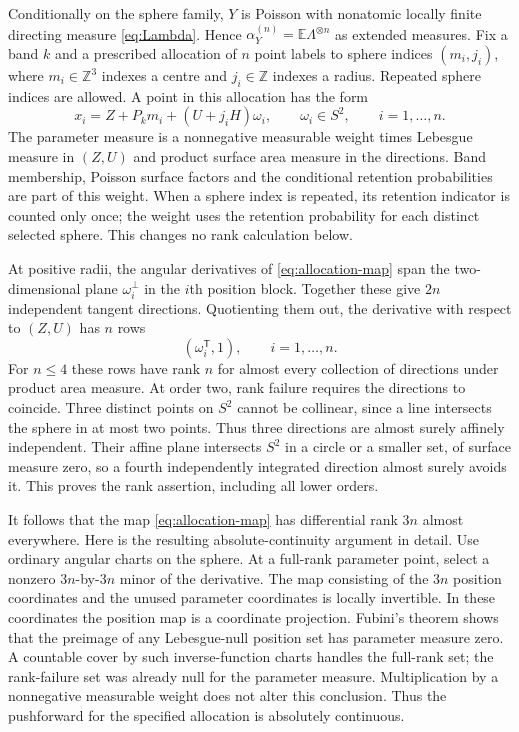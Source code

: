 \documentclass[11pt,a4paper]{article}
\numberwithin{equation}{section}
\theoremstyle{definition}
\theoremstyle{remark}
\newcommand{\E}{\mathbb E}
\begin{document}
Conditionally on the sphere family, $Y$ is Poisson with nonatomic locally
finite directing measure \eqref{eq:Lambda}. Hence
$\alpha_Y^{(n)}=\E\Lambda^{\otimes n}$ as extended measures. Fix a band
$k$ and a prescribed allocation of $n$ point labels to sphere indices
$(m_i,j_i)$, where $m_i\in\mathbb Z^3$ indexes a centre and
$j_i\in\mathbb Z$ indexes a radius. Repeated sphere indices are allowed.
A point in this allocation has the form
\begin{equation}
 x_i=Z+P_km_i+(U+j_iH)\omega_i,
 \qquad\omega_i\in S^2,\qquad i=1,\ldots,n.
 \label{eq:allocation-map}
\end{equation}
The parameter measure is a nonnegative measurable weight times Lebesgue
measure in $(Z,U)$ and product surface area measure in the directions.
Band membership, Poisson surface factors and the conditional retention
probabilities are part of this weight. When a sphere index is repeated,
its retention indicator is counted only once; the weight uses the
retention probability for each distinct selected sphere. This changes
no rank calculation below.

At positive radii, the angular derivatives of
\eqref{eq:allocation-map} span the two-dimensional plane
$\omega_i^\perp$ in the $i$th position block. Together these give $2n$
independent tangent directions. Quotienting them out, the derivative with
respect to $(Z,U)$ has $n$ rows
\begin{equation}
 (\omega_i^{\mathsf T},1),\qquad i=1,\ldots,n.
 \label{eq:normal-rows}
\end{equation}
For $n\leq4$ these rows have rank $n$ for almost every collection of
directions under product area measure. At order two, rank failure
requires the directions to coincide. Three distinct points on $S^2$
cannot be collinear, since a line intersects the sphere in at most two
points. Thus three directions are almost surely affinely independent.
Their affine plane intersects $S^2$ in a circle or a smaller set, of
surface measure zero, so a fourth independently integrated direction
almost surely avoids it. This proves the rank assertion, including all
lower orders.

It follows that the map \eqref{eq:allocation-map} has differential rank
$3n$ almost everywhere. Here is the resulting absolute-continuity argument
in detail. Use ordinary angular charts on the sphere. At a full-rank
parameter point, select a nonzero $3n$-by-$3n$ minor of the derivative.
The map consisting of the $3n$ position coordinates and the unused
parameter coordinates is locally invertible. In these coordinates the
position map is a coordinate projection. Fubini's theorem shows that the
preimage of any Lebesgue-null position set has parameter measure zero.
A countable cover by such inverse-function charts handles the full-rank
set; the rank-failure set was already null for the parameter measure.
Multiplication by a nonnegative measurable weight does not alter this
conclusion. Thus the pushforward for the specified allocation is
absolutely continuous.
\end{document}
